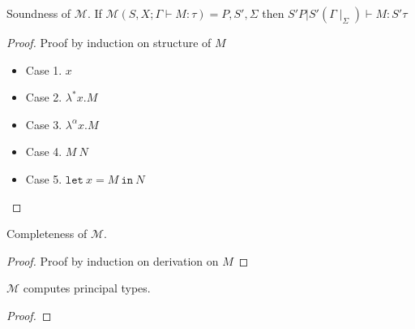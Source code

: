 \begin{theorem}
  Soundness of $\mathcal{M}$. If $\mathcal{M}(S, X; \Gamma \vdash M : \tau) = P, S', \Sigma$ then $S' P | S' (\Gamma\mid_{\Sigma}) \vdash M : S' \tau$
\end{theorem}

\begin{proof}
  Proof by induction on structure of $M$
  \begin{itemize}
  \item Case 1. $x$
  \item Case 2. $\lambda^{*} x. M$
  \item Case 3. $\lambda ^{\alpha}x. M$
  \item Case 4. $M\ N$
  \item Case 5. $\texttt{let}\ x = M\ \texttt{in}\ N$
  \end{itemize}

\end{proof}

\begin{theorem}
  Completeness of $\mathcal{M}$.
\end{theorem}
\begin{proof}
  Proof by induction on derivation on $M$
\end{proof}

\begin{theorem}
  $\mathcal{M}$ computes principal types.
\end{theorem}
\begin{proof}

\end{proof}